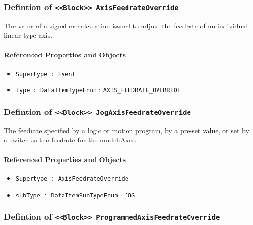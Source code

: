 \subsubsection{Defintion of \texttt{<<Block>> AxisFeedrateOverride}}
  \label{type:AxisFeedrateOverride}

\FloatBarrier

The value of a signal or calculation issued to adjust the feedrate of an individual linear type axis.

\FloatBarrier
\paragraph{Referenced Properties and Objects}

\begin{itemize}
\item \texttt{Supertype : Event}

\item \texttt{type : DataItemTypeEnum} : \texttt{AXIS_FEEDRATE_OVERRIDE}

\end{itemize}
\FloatBarrier
\subsubsection{Defintion of \texttt{<<Block>> JogAxisFeedrateOverride}}
  \label{type:JogAxisFeedrateOverride}

\FloatBarrier

The feedrate specified by a logic or motion program, by a pre-set value, or set by a switch as the feedrate for the {model:Axes}. 

\FloatBarrier
\paragraph{Referenced Properties and Objects}

\begin{itemize}
\item \texttt{Supertype : AxisFeedrateOverride}

\item \texttt{subType : DataItemSubTypeEnum} : \texttt{JOG}

\end{itemize}
\FloatBarrier
\subsubsection{Defintion of \texttt{<<Block>> ProgrammedAxisFeedrateOverride}}
  \label{type:ProgrammedAxisFeedrateOverride}

